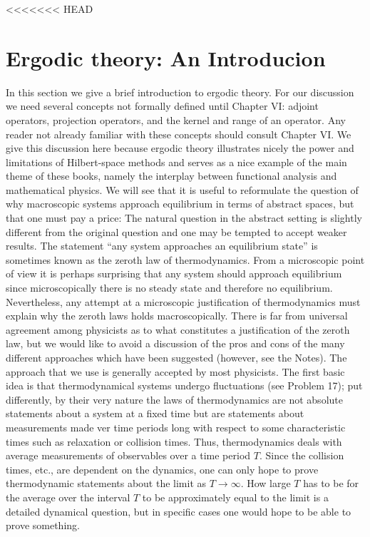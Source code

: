 <<<<<<< HEAD
\section{Ergodic theory: An Introducion}

In this section we give a brief introduction to ergodic theory. For our discussion we need several concepts not formally defined until Chapter VI: adjoint operators, projection operators, and the kernel and range of an operator. Any reader not already familiar with these concepts should consult Chapter VI. We give this discussion here because ergodic theory illustrates nicely the power and limitations of Hilbert-space methods and serves as a nice example of the main theme of these books, namely the interplay between functional analysis and mathematical physics. We will see that it is useful to reformulate the question of why macroscopic systems approach equilibrium in terms of abstract spaces, but that one must pay a price: The natural question in the abstract setting is slightly different from the original question and one may be tempted to accept weaker results. The statement \enquote{any system approaches an equilibrium state} is sometimes known as the zeroth law of thermodynamics. From a microscopic point of view it is perhaps surprising that any system should approach equilibrium since microscopically there is no steady state and therefore no equilibrium.
Nevertheless, any attempt at a microscopic justification of thermodynamics must explain why the zeroth laws holds macroscopically. There is far from universal agreement among physicists as to what constitutes a justification of the zeroth law, but we would like to avoid a discussion of the pros and cons of the many different approaches which have been suggested (however, see the Notes). The approach that we use is generally accepted by most physicists. The first basic idea is that thermodynamical systems undergo fluctuations (see Problem 17); put differently, by their very nature the laws of thermodynamics are not absolute statements about a system at a fixed time but are statements about measurements made ver time periods long with respect to some characteristic times such as relaxation or collision times. Thus, thermodynamics deals with average measurements of observables over a time period $T$. Since the collision times, etc., are dependent on the dynamics, one can only hope to prove thermodynamic statements about the limit as $T \rightarrow \infty$.
How large $T$ has to be for the average over the interval $T$ to be approximately equal to the limit is a detailed dynamical question, but in specific cases one would hope to be able to prove something.
